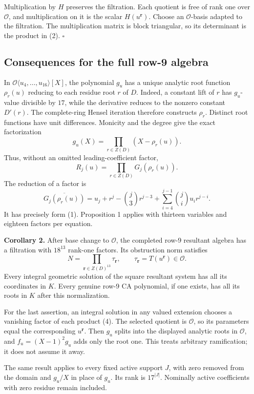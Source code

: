 \documentclass[
  british,
  10pt,
]{article}
\begin{document}
Multiplication by \(H\) preserves the filtration. Each quotient is free
of rank one over \(\mathcal O\), and multiplication on it is the scalar
\(H(u^{\mathbf r})\). Choose an \(\mathcal O\)-basis adapted to the
filtration. The multiplication matrix is block triangular, so its
determinant is the product in (2). \(\square\)

\subsection{Consequences for the full row-9
algebra}\label{consequences-for-the-full-row-9-algebra}

In \(\mathcal O\langle u_4,\ldots,u_{16}\rangle[X]\), the polynomial
\(g_u\) has a unique analytic root function \(\rho_r(u)\) reducing to
each residue root \(r\) of \(D\). Indeed, a constant lift of \(r\) has
\(g_u\)-value divisible by \(17\), while the derivative reduces to the
nonzero constant \(D'(r)\). The complete-ring Hensel iteration therefore
constructs \(\rho_r\). Distinct root functions have unit differences.
Monicity and the degree give the exact factorization \[
g_u(X)=\prod_{r\in Z(D)}(X-\rho_r(u)).
\] Thus, without an omitted leading-coefficient factor, \[
R_j(u)=\prod_{r\in Z(D)}G_j(\rho_r(u)).
\tag{4}
\] The reduction of a factor is \[
\overline{G_j(\rho_r(u))}
=u_j+r^j-\binom j3r^{j-3}
+\sum_{i=4}^{j-1}\binom ji u_i r^{j-i}.
\] It has precisely form (1). Proposition 1 applies with thirteen
variables and eighteen factors per equation.

\textbf{Corollary 2.} After base change to \(\mathcal O\), the completed
row-9 resultant algebra has a filtration with \(18^{13}\) rank-one
factors. Its obstruction norm satisfies \[
N=\prod_{\mathbf r\in Z(D)^{13}}\tau_{\mathbf r},
\qquad
\tau_{\mathbf r}=T(u^{\mathbf r})\in\mathcal O.
\tag{5}
\] Every integral geometric solution of the square resultant system has
all its coordinates in \(K\). Every genuine row-9 CA polynomial, if one
exists, has all its roots in \(K\) after this normalization.

For the last assertion, an integral solution in any valued extension
chooses a vanishing factor of each product (4). The selected quotient is
\(\mathcal O\), so its parameters equal the corresponding
\(u^{\mathbf r}\). Then \(g_u\) splits into the displayed analytic roots
in \(\mathcal O\), and \(f_u=(X-1)^2g_u\) adds only the root one. This
treats arbitrary ramification; it does not assume it away.

The same result applies to every fixed active support \(J\), with zero
removed from the domain and \(g_u/X\) in place of \(g_u\). Its rank is
\(17^{|J|}\). Nominally active coefficients with zero residue remain
included.
\end{document}
